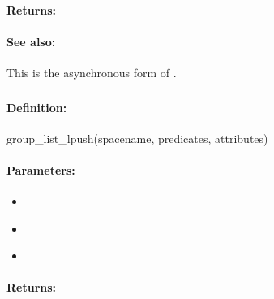 \paragraph{Returns:}


\paragraph{See also:}  This is the asynchronous form of .

\pagebreak
\subsubsection{}
\label{api:ruby:group_list_lpush}


\paragraph{Definition:}
\begin{rubycode}
group_list_lpush(spacename, predicates, attributes)
\end{rubycode}

\paragraph{Parameters:}
\begin{itemize}[noitemsep]
\item {}\\

\item {}\\

\item {}\\

\end{itemize}

\paragraph{Returns:}


\pagebreak
\subsubsection{}
\label{api:ruby:async_group_list_lpush}


